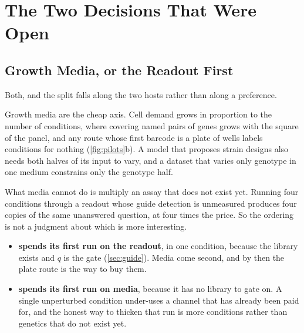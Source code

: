 
\section{The Two Decisions That Were Open}
\label{sec:open}

\subsection{Growth Media, or the Readout First}
\label{sec:media}

Both, and the split falls along the two hosts rather than along a preference.

Growth media are the cheap axis. Cell demand grows in proportion to the number
of conditions, where covering named pairs of genes grows with the square of the
panel, and any route whose first barcode is a plate of wells labels conditions
for nothing (\cref{fig:pilots}b). A model that proposes strain designs also
needs both halves of its input to vary, and a dataset that varies only genotype
in one medium constrains only the genotype half.

What media cannot do is multiply an assay that does not exist yet. Running four
conditions through a readout whose guide detection is unmeasured produces four
copies of the same unanswered question, at four times the price. So the ordering
is not a judgment about which is more interesting.

\begin{itemize}[leftmargin=1.4em,itemsep=2pt,topsep=2pt]
  \item \textbf{ spends its first run on the readout}, in
    one condition, because the library exists and $q$ is the gate
    (\cref{sec:guide}). Media come second, and by then the plate route is the
    way to buy them.
  \item \textbf{ spends its first run on media}, because it
    has no library to gate on. A single unperturbed condition under-uses a
    channel that has already been paid for, and the honest way to thicken that
    run is more conditions rather than genetics that do not exist yet.
\end{itemize}

